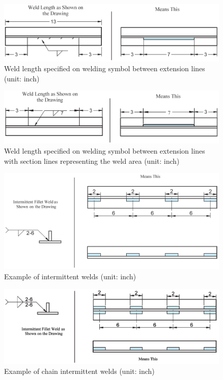 \begin{figure}[H]
\centering
\includegraphics[width=.99\textwidth]{PIC/CH07/EXAMPLE/WL}
\caption{Weld length specified on welding symbol between extension lines (unit: inch) \citep{Corgan2017}}
\end{figure}
\begin{figure}[H]
\centering
\includegraphics[width=.99\textwidth]{PIC/CH07/EXAMPLE/WL2}
\caption{Weld length specified on welding symbol between extension lines with
section lines representing the weld area (unit: inch) \citep{Corgan2017}}
\end{figure}
\begin{figure}[H]
\centering
\includegraphics[width=.99\textwidth]{PIC/CH07/EXAMPLE/IW}
\caption{Example of intermittent welds (unit: inch) \citep{Corgan2017}}
\end{figure}
\begin{figure}[H]
\centering
\includegraphics[width=.99\textwidth]{PIC/CH07/EXAMPLE/IW1}
\caption{Example of chain intermittent welds (unit: inch) \citep{Corgan2017}}
\end{figure}
